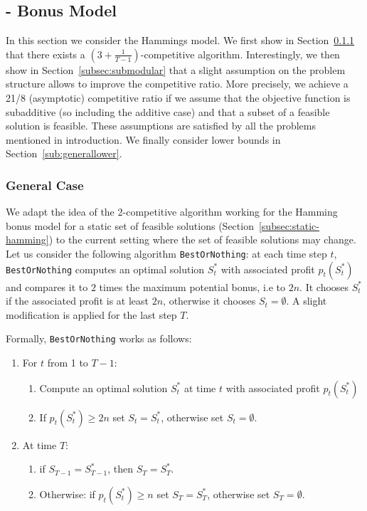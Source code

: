 \documentclass[a4paper]{book}
\newcommand{\finalversion}[1]{#1}
\newcommand{\easy}[5]{Hamming}
\begin{document}
\subsection{\easy{} $\text{}$- Bonus Model}
\label{subsec:general-hamming}

In this section we consider the \easy{} bonus model. We first show in Section~\ref{subsec:general} that there exists a $\left(3+\frac{1}{T-1}\right)$-competitive algorithm.
Interestingly, we then show in Section~\ref{subsec:submodular} that a slight assumption on the problem structure allows to improve the competitive ratio. More precisely, we achieve a 21/8 (asymptotic) competitive ratio if we assume that the objective function is \finalversion{subadditive (so including the additive case)} and that a subset of a feasible solution is feasible. These assumptions are satisfied by all the problems mentioned in introduction.
We finally consider lower bounds in Section~\ref{sub:generallower}.

\subsubsection{General Case}\label{subsec:general}


We adapt the idea of the 2-competitive algorithm working for the Hamming bonus model for a static set of feasible solutions (Section~\ref{subsec:static-hamming}) to the current setting where the set of feasible solutions may change.  Let us consider the following algorithm \texttt{BestOrNothing}: at each time step $t$, \texttt{BestOrNothing} computes an optimal solution $S_t^*$ with associated profit $p_t(S_t^*)$ and compares it to $2$ times the maximum potential bonus, i.e to $2n$. It chooses $S^*_t$ if the associated profit is at least $2n$, otherwise it chooses $S_t=\emptyset$. A slight modification is applied for the last step  $T$. %

Formally, \texttt{BestOrNothing}  works as follows: 

\begin{enumerate}
\item For $t$ from 1 to $T-1$:
\begin{enumerate}
	\item Compute an optimal solution $S^*_t$ at time $t$ with associated profit $p_t(S_t^*)$ 
	\item If $p_t(S_t^*)\geq 2n$ set $S_t=S^*_t$, otherwise set $S_t=\emptyset$.
\end{enumerate}
\item At time $T$:
	\begin{enumerate}
	\item if $S_{T-1}=S^*_{T-1}$, then $S_T=S^*_T$. 
	\item Otherwise: if $p_t(S_t^*)\geq n$ set $S_T=S^*_T$, otherwise set $S_T=\emptyset$.
	\end{enumerate}
\end{enumerate}
\end{document}
